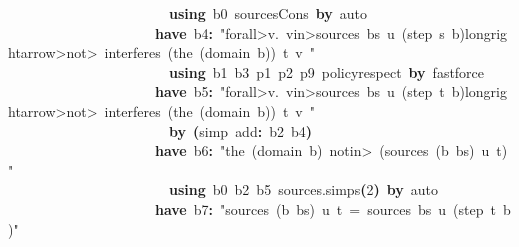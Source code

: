 \documentclass{article}
\newcommand{\syntaxKEYWORDA}[1]{\textcolor[rgb]{0.0,0.4,0.6}{\textbf{#1}}}
\newcommand{\syntaxLITERALA}[1]{\textcolor[rgb]{1.0,0.0,0.8}{#1}}
\newcommand{\syntaxOPERATOR}[1]{\textcolor[rgb]{0.0,0.0,0.0}{\textbf{#1}}}
\newcommand{\syntaxKEYWORDA}[1]{\textcolor[rgb]{0.0,0.4,0.6}{\textbf{#1}}}
\newcommand{\syntaxLITERALA}[1]{\textcolor[rgb]{1.0,0.0,0.8}{#1}}
\newcommand{\syntaxOPERATOR}[1]{\textcolor[rgb]{0.0,0.0,0.0}{\textbf{#1}}}
\newcommand{\syntaxKEYWORDA}[1]{\textcolor[rgb]{0.0,0.4,0.6}{\textbf{#1}}}
\newcommand{\syntaxLITERALA}[1]{\textcolor[rgb]{1.0,0.0,0.8}{#1}}
\newcommand{\syntaxOPERATOR}[1]{\textcolor[rgb]{0.0,0.0,0.0}{\textbf{#1}}}
\newcommand{\syntaxKEYWORDA}[1]{\textcolor[rgb]{0.0,0.4,0.6}{#1}}
\newcommand{\syntaxLITERALA}[1]{\textcolor[rgb]{1.0,0.0,0.8}{\textbf{#1}}}
\newcommand{\syntaxOPERATOR}[1]{\textcolor[rgb]{0.0,0.0,0.0}{#1}}
\newcommand{\syntaxKEYWORDA}[1]{\textcolor[rgb]{0.0,0.4,0.6}{\textbf{#1}}}
\newcommand{\syntaxLITERALA}[1]{\textcolor[rgb]{1.0,0.0,0.8}{#1}}
\newcommand{\syntaxOPERATOR}[1]{\textcolor[rgb]{0.0,0.0,0.0}{\textbf{#1}}}
\newcommand{\syntaxKEYWORDA}[1]{\textcolor[rgb]{0.0,0.4,0.6}{\textbf{#1}}}
\newcommand{\syntaxLITERALA}[1]{\textcolor[rgb]{1.0,0.0,0.8}{#1}}
\newcommand{\syntaxOPERATOR}[1]{\textcolor[rgb]{0.0,0.0,0.0}{\textbf{#1}}}
\begin{document}
{\ }{\ }{\ }{\ }{\ }{\ }{\ }{\ }{\ }{\ }{\ }{\ }{\ }{\ }{\ }{\ }{\ }{\ }{\ }{\ }{\ }{\ }{\ }\syntaxKEYWORDA{using}{\ }b0{\ }sources\usebox{\underscorebox}Cons{\ }\syntaxKEYWORDA{by}{\ }auto\hspace*{\fill}\\
{\ }{\ }{\ }{\ }{\ }{\ }{\ }{\ }{\ }{\ }{\ }{\ }{\ }{\ }{\ }{\ }{\ }{\ }{\ }{\ }{\ }\syntaxKEYWORDA{have}{\ }b4\syntaxOPERATOR{:}{\ }\syntaxLITERALA{"\<forall>v.{\ }v\<in>sources{\ }bs{\ }u{\ }(step{\ }s{\ }b)\<longrightarrow>\<not>{\ }interferes{\ }(the{\ }(domain{\ }b)){\ }t{\ }v{\ }"}\hspace*{\fill}\\
{\ }{\ }{\ }{\ }{\ }{\ }{\ }{\ }{\ }{\ }{\ }{\ }{\ }{\ }{\ }{\ }{\ }{\ }{\ }{\ }{\ }{\ }{\ }\syntaxKEYWORDA{using}{\ }b1{\ }b3{\ }p1{\ }p2{\ }p9{\ }policy\usebox{\underscorebox}respect{\ }\syntaxKEYWORDA{by}{\ }fastforce\hspace*{\fill}\\
{\ }{\ }{\ }{\ }{\ }{\ }{\ }{\ }{\ }{\ }{\ }{\ }{\ }{\ }{\ }{\ }{\ }{\ }{\ }{\ }{\ }\syntaxKEYWORDA{have}{\ }b5\syntaxOPERATOR{:}{\ }\syntaxLITERALA{"\<forall>v.{\ }v\<in>sources{\ }bs{\ }u{\ }(step{\ }t{\ }b)\<longrightarrow>\<not>{\ }interferes{\ }(the{\ }(domain{\ }b)){\ }t{\ }v{\ }"}\hspace*{\fill}\\
{\ }{\ }{\ }{\ }{\ }{\ }{\ }{\ }{\ }{\ }{\ }{\ }{\ }{\ }{\ }{\ }{\ }{\ }{\ }{\ }{\ }{\ }{\ }\syntaxKEYWORDA{by}{\ }\syntaxOPERATOR{(}simp{\ }add\syntaxOPERATOR{:}{\ }b2{\ }b4\syntaxOPERATOR{)}\hspace*{\fill}\\
{\ }{\ }{\ }{\ }{\ }{\ }{\ }{\ }{\ }{\ }{\ }{\ }{\ }{\ }{\ }{\ }{\ }{\ }{\ }{\ }{\ }\syntaxKEYWORDA{have}{\ }b6\syntaxOPERATOR{:}{\ }\syntaxLITERALA{"the{\ }(domain{\ }b){\ }\<notin>{\ }(sources{\ }(b{\ }\usebox{\hashbox}{\ }bs){\ }u{\ }t)"}\hspace*{\fill}\\
{\ }{\ }{\ }{\ }{\ }{\ }{\ }{\ }{\ }{\ }{\ }{\ }{\ }{\ }{\ }{\ }{\ }{\ }{\ }{\ }{\ }{\ }{\ }\syntaxKEYWORDA{using}{\ }b0{\ }b2{\ }b5{\ }sources.simps\syntaxOPERATOR{(}2\syntaxOPERATOR{)}{\ }\syntaxKEYWORDA{by}{\ }auto\hspace*{\fill}\\
{\ }{\ }{\ }{\ }{\ }{\ }{\ }{\ }{\ }{\ }{\ }{\ }{\ }{\ }{\ }{\ }{\ }{\ }{\ }{\ }{\ }\syntaxKEYWORDA{have}{\ }b7\syntaxOPERATOR{:}{\ }\syntaxLITERALA{"sources{\ }(b{\ }\usebox{\hashbox}{\ }bs){\ }u{\ }t{\ }={\ }sources{\ }bs{\ }u{\ }(step{\ }t{\ }b)"}\hspace*{\fill}\\
\end{document}
